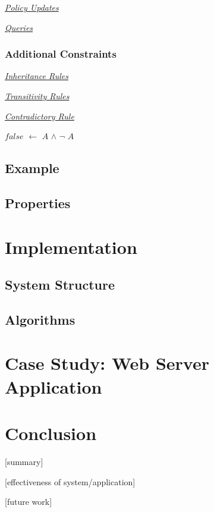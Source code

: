 \documentclass[10pt, twocolumn]{article}
\begin{document}
        \noindent\underline{\emph{Policy Updates}}

        \noindent\underline{\emph{Queries}}

      \subsubsection{Additional Constraints}

        \noindent\underline{\emph{Inheritance Rules}}

        \noindent\underline{\emph{Transitivity Rules}}

        \noindent\underline{\emph{Contradictory Rule}}

          $false$ $\leftarrow$ $A$ $\land$ $\lnot$ $A$

    \subsection{Example}

    \subsection{Properties}

  \section{Implementation}

    \subsection{System Structure}

    \subsection{Algorithms}

  \section{Case Study: Web Server Application}

  \section{Conclusion}

    [summary]

    [effectiveness of system/application]

    [future work]
\end{document}
